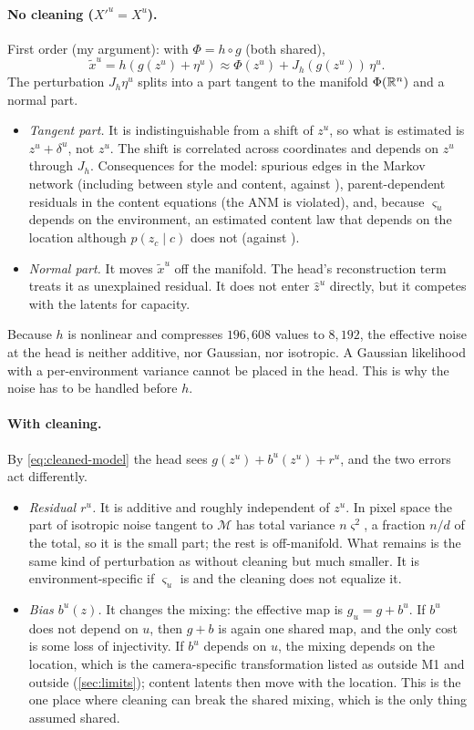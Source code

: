 \paragraph{No cleaning ($X'^u=X^u$).} First order (my argument): with $\Phi=h\circ g$ (both shared),
\[
\tilde x^u=h(g(z^u)+\eta^u)\approx\Phi(z^u)+J_h(g(z^u))\,\eta^u .
\]
The perturbation $J_h\eta^u$ splits into a part tangent to the manifold $\Phi(\mathbb{R}^n)$ and a normal part.
\begin{itemize}[leftmargin=1.5em]
\item \emph{Tangent part.} It is indistinguishable from a shift of $z^u$, so what is estimated is
      $z^u+\delta^u$, not $z^u$. The shift is correlated across coordinates and depends on $z^u$ through
      $J_h$. Consequences for the model: spurious edges in the Markov network (including between
      style and content, against ), parent-dependent residuals in the content
      equations (the ANM is violated), and, because $\varsigma_u$ depends on the environment, an
      estimated content law that depends on the location although $p(z_c\mid c)$ does not
      (against ).
\item \emph{Normal part.} It moves $\tilde x^u$ off the manifold. The head's reconstruction term treats
      it as unexplained residual. It does not enter $\hat z^u$ directly, but it competes with the
      latents for capacity.
\end{itemize}
Because $h$ is nonlinear and compresses $196{,}608$ values to $8{,}192$, the effective noise at the head
is neither additive, nor Gaussian, nor isotropic. A Gaussian likelihood with a per-environment
variance cannot be placed in the head. This is why the noise has to be handled before $h$.

\paragraph{With cleaning.} By \cref{eq:cleaned-model} the head sees $g(z^u)+b^u(z^u)+r^u$, and the two
errors act differently.
\begin{itemize}[leftmargin=1.5em]
\item \emph{Residual $r^u$.} It is additive and roughly independent of $z^u$. In pixel space the part of
      isotropic noise tangent to $\mathcal M$ has total variance $n\varsigma^2$, a fraction $n/d$ of the
      total, so it is the small part; the rest is off-manifold. What remains is the same kind of
      perturbation as without cleaning but much smaller. It is environment-specific if $\varsigma_u$ is
      and the cleaning does not equalize it.
\item \emph{Bias $b^u(z)$.} It changes the mixing: the effective map is $g_u=g+b^u$. If $b^u$ does not
      depend on $u$, then $g+b$ is again one shared map, and the only cost is some loss of
      injectivity. If $b^u$ depends on $u$, the mixing depends on the location, which is the
      camera-specific transformation listed as outside M1 and outside \cite{ng2025}
      (\cref{sec:limits}); content latents then move with the location. This is the one place where
      cleaning can break the shared mixing, which is the only thing assumed shared.
\end{itemize}

